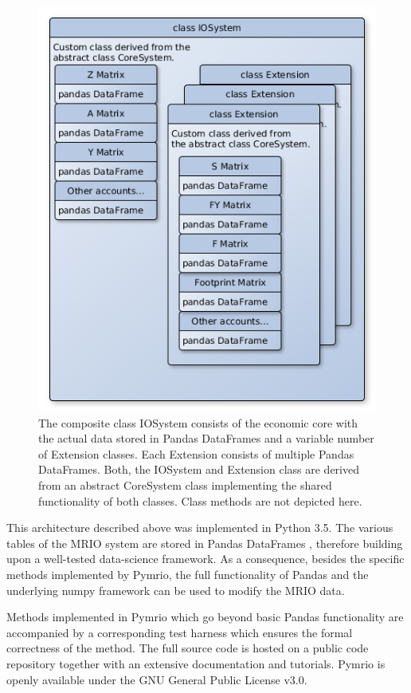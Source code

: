 \documentclass{jors}
\begin{document}
{\begin{figure}[h!]
  \includegraphics[width=.9\textwidth]{./fig/IOSystem.png}
  \caption{
  The composite class IOSystem consists of the economic core with the actual data stored in Pandas DataFrames and a variable number of Extension classes. Each Extension consists of multiple Pandas DataFrames. Both, the IOSystem and Extension class are derived from an abstract CoreSystem class implementing the shared functionality of both classes. Class methods are not depicted here.}
  \end{figure}

This architecture described above was implemented in Python 3.5.
The various tables of the MRIO system are stored in Pandas DataFrames \cite{mckinney2010}, therefore building upon a well-tested data-science framework.
As a consequence, besides the specific methods implemented by Pymrio, the full functionality of Pandas and the underlying numpy framework \cite{vanderwalt2011} can be used to modify the MRIO data.

Methods implemented in Pymrio which go beyond basic Pandas functionality are accompanied by a corresponding test harness which ensures the formal correctness of the method.
The full source code is hosted on a public code repository \cite{stadler2018a} 
together with an extensive documentation and tutorials.  
Pymrio is openly available under the GNU General Public License v3.0.

}
\end{document}
